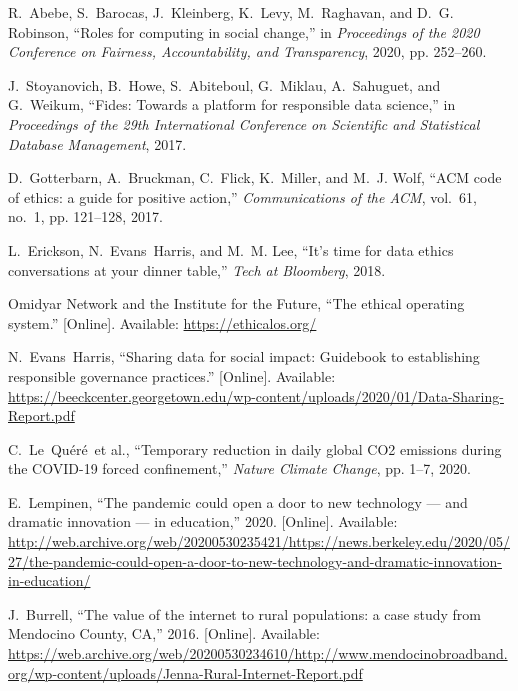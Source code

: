 \documentclass[11pt]{article}
\begin{document}
\begin{thebibliography}{10}
R.~Abebe, S.~Barocas, J.~Kleinberg, K.~Levy, M.~Raghavan, and D.~G. Robinson,
  ``Roles for computing in social change,'' in \emph{Proceedings of the 2020
  Conference on Fairness, Accountability, and Transparency}, 2020, pp.
  252--260.

J.~Stoyanovich, B.~Howe, S.~Abiteboul, G.~Miklau, A.~Sahuguet, and G.~Weikum,
  ``Fides: Towards a platform for responsible data science,'' in
  \emph{Proceedings of the 29th International Conference on Scientific and
  Statistical Database Management}, 2017.

D.~Gotterbarn, A.~Bruckman, C.~Flick, K.~Miller, and M.~J. Wolf, ``{ACM code of
  ethics: a guide for positive action},'' \emph{Communications of the ACM},
  vol.~61, no.~1, pp. 121--128, 2017.

L.~Erickson, N.~Evans~Harris, and M.~M. Lee, ``It's time for data ethics
  conversations at your dinner table,'' \emph{Tech at Bloomberg}, 2018.

\BIBentryALTinterwordspacing
{Omidyar Network and the Institute for the Future}, ``The ethical operating
  system.'' [Online]. Available: \url{https://ethicalos.org/}
\BIBentrySTDinterwordspacing

\BIBentryALTinterwordspacing
N.~Evans~Harris, ``Sharing data for social impact: Guidebook to establishing
  responsible governance practices.'' [Online]. Available:
  \url{https://beeckcenter.georgetown.edu/wp-content/uploads/2020/01/Data-Sharing-Report.pdf}
\BIBentrySTDinterwordspacing

C.~Le~Qu{\'e}r{\'e}~et al., ``{Temporary reduction in daily global CO2
  emissions during the COVID-19 forced confinement},'' \emph{Nature Climate
  Change}, pp. 1--7, 2020.

\BIBentryALTinterwordspacing
E.~Lempinen, ``The pandemic could open a door to new technology — and
  dramatic innovation — in education,'' 2020. [Online]. Available:
  \url{http://web.archive.org/web/20200530235421/https://news.berkeley.edu/2020/05/27/the-pandemic-could-open-a-door-to-new-technology-and-dramatic-innovation-in-education/}
\BIBentrySTDinterwordspacing

\BIBentryALTinterwordspacing
J.~Burrell, ``{The value of the internet to rural populations: a case study
  from Mendocino County, CA},'' 2016. [Online]. Available:
  \url{https://web.archive.org/web/20200530234610/http://www.mendocinobroadband.org/wp-content/uploads/Jenna-Rural-Internet-Report.pdf}
\BIBentrySTDinterwordspacing


\end{thebibliography}
\end{document}
